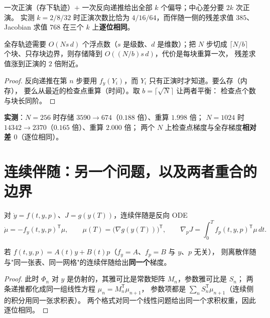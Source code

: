 \begin{corollary}[代价与参数个数无关]\label{cor:cost-k}
一次正演（存下轨迹）$+$ 一次反向递推给出全部 $k$ 个偏导；中心差分要 $2k$ 次正演。
实测 $k=2/8/32$ 时正演次数比恰为 $4/16/64$，而伴随一侧的残差求值 $385$、
Jacobian 求值 $768$ 在三个 $k$ 上\textbf{逐位相同}。
\end{corollary}

\begin{theorem}[伴随法不免费]\label{thm:not-free}
全存轨迹需要 $O(Ns\,d)$ 个浮点数（$s$ 是级数、$d$ 是维数）；把 $N$ 步切成
$\lceil N/b\rceil$ 个块、只存块边界，则存储降到 $O((N/b)s\,d)$，代价是每块重算一次，
残差求值涨到正演的 $2$ 倍附近。
\end{theorem}

\begin{proof}
反向递推在第 $n$ 步要用 $f_y(Y_i)$，而 $Y_i$ 只有正演时才知道。要么存（内存），
要么从最近的检查点重算（时间）。取 $b=\lceil\sqrt N\rceil$ 让两者平衡：
检查点个数与块长同阶。
\end{proof}

\textbf{实测}：$N=256$ 时存储 $3590\to674$（$0.188$ 倍）、重算 $1.998$ 倍；
$N=1024$ 时 $14342\to2370$（$0.165$ 倍）、重算 $2.000$ 倍；
两个 $N$ 上检查点梯度与全存梯度\textbf{相对差 $0$}（逐位相同）。

\section{连续伴随：另一个问题，以及两者重合的边界}

\begin{definition}[连续伴随]\label{def:continuous-adjoint}
对 $\dot y=f(t,y,p)$、$J=g(y(T))$，连续伴随是反向 ODE
\[
\dot\mu=-f_y(t,y,p)^{\mathsf T}\mu,\qquad \mu(T)=\bigl(\nabla g(y(T))\bigr)^{\mathsf T},
\qquad
\nabla_pJ=\int_0^T f_p(t,y,p)^{\mathsf T}\mu\,dt .
\]
\end{definition}

\begin{theorem}[常雅可比时两者重合]\label{thm:linear-coincide}
若 $f(t,y,p)=A(t)y+B(t)p$（$f_y=A$、$f_p=B$ 与 $y$、$p$ 无关），
则离散伴随与"同一张表、同一网格"的连续伴随给出\textbf{同一个}梯度。
\end{theorem}

\begin{proof}
此时 $\Phi_n$ 对 $y$ 是仿射的，其雅可比是常数矩阵 $M_n$，参数雅可比是 $S_n$；
两条递推都化成同一组线性方程 $\mu_n=M_n^{\mathsf T}\mu_{n+1}$，
参数项都是 $\sum_nS_n^{\mathsf T}\mu_{n+1}$（连续侧的积分用同一张求积表）。
两个格式对同一个线性问题给出同一个求积权重，因此逐位相同。
\end{proof}

